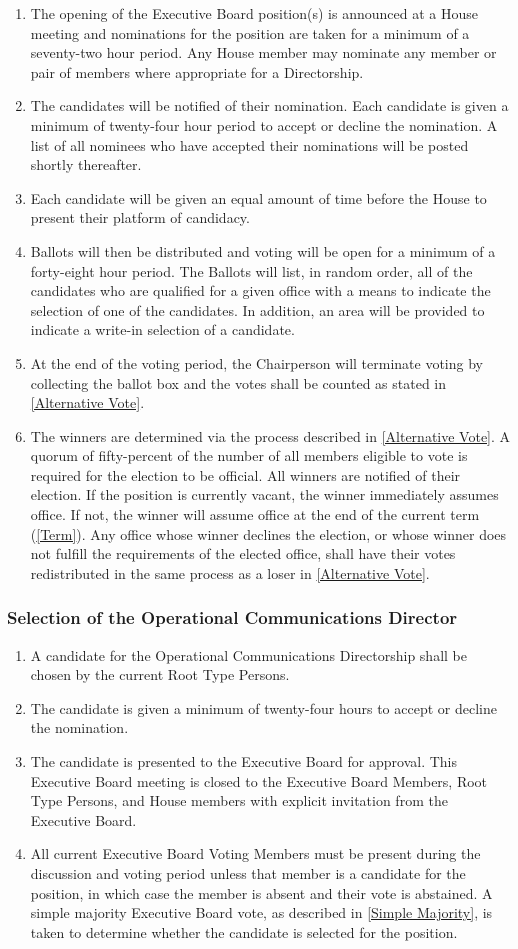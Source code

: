 \documentclass{article}
\newcommand{\asubsection}[1]{\subsubsection{#1} \label{#1}}
\begin{document}
\begin{enumerate}
	\item The opening of the Executive Board position(s) is announced at a House meeting and nominations for the position are taken for a minimum of a seventy-two hour period.
		Any House member may nominate any member or pair of members where appropriate for a Directorship.
	\item The candidates will be notified of their nomination.
		Each candidate is given a minimum of twenty-four hour period to accept or decline the nomination.
		A list of all nominees who have accepted their nominations will be posted shortly thereafter.
	\item Each candidate will be given an equal amount of time before the House to present their platform of candidacy.
	\item Ballots will then be distributed and voting will be open for a minimum of a forty-eight hour period.
		The Ballots will list, in random order, all of the candidates who are qualified for a given office with a means to indicate the selection of one of the candidates.
		In addition, an area will be provided to indicate a write-in selection of a candidate.
	\item At the end of the voting period, the Chairperson will terminate voting by collecting the ballot box and the votes shall be counted as stated in \ref{Alternative Vote}.
	\item The winners are determined via the process described in \ref{Alternative Vote}.
		A quorum of fifty-percent of the number of all members eligible to vote is required for the election to be official.
		All winners are notified of their election.
		If the position is currently vacant, the winner immediately assumes office.
		If not, the winner will assume office at the end of the current term (\ref{Term}).
		Any office whose winner declines the election, or whose winner does not fulfill the requirements of the elected office, shall have their votes redistributed in the same process as a loser in \ref{Alternative Vote}.
\end{enumerate}
\asubsection{Selection of the Operational Communications Director}
\begin{enumerate}
	\item A candidate for the Operational Communications Directorship shall be chosen by the current Root Type Persons.
	\item The candidate is given a minimum of twenty-four hours to accept or decline the nomination.
	\item The candidate is presented to the Executive Board for approval.
		This Executive Board meeting is closed to the Executive Board Members, Root Type Persons, and House members with explicit invitation from the Executive Board.
	\item All current Executive Board Voting Members must be present during the discussion and voting period unless that member is a candidate for the position, in which case the member is absent and their vote is abstained.
		A simple majority Executive Board vote, as described in \ref{Simple Majority}, is taken to determine whether the candidate is selected for the position.
\end{enumerate}
\end{document}

